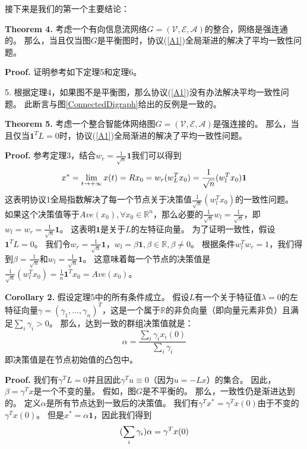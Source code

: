 \documentclass{article}
\begin{document}
接下来是我们的第一个主要结论：

\noindent \textbf{Theorem 4.} 考虑一个有向信息流网络$G=(\mathcal{V}, \mathcal{E}, \mathcal{A})$的整合，网络是强连通的。
那么，当且仅当图$G$是平衡图时，协议(\ref{A1})全局渐进的解决了平均一致性问题。

\noindent \textbf{Proof.} 证明参考如下定理5和定理6。

 5. 根据定理4，如果图不是平衡图，那么协议(\ref{A1})没有办法解决平均一致性问题。
此断言与图\ref{ConnectedDigraph}给出的反例是一致的。

\noindent \textbf{Theorem 5.} 考虑一个整合智能体网络图$G=(\mathcal{V}, \mathcal{E}, \mathcal{A})$是强连接的。
那么，当且仅当$\mathbf{1}^TL=0$时，协议(\ref{A1})全局渐进的解决了平均一致性问题。

\noindent \textbf{Proof.} 参考定理3，结合$w_r = \frac{1}{\sqrt{n}}\mathbf{1}$我们可以得到
\begin{equation}
    x^* = \lim_{t\rightarrow +\infty}x(t) = Rx_0 = w_r(w_L^T x_0) = \frac{1}{\sqrt{n}}(w_l^Tx_0)\mathbf{1}
    \notag
\end{equation}
这表明协议1全局指数解决了每一个节点关于决策值$\frac{1}{\sqrt{n}}(w_l^Tx_0)$的一致性问题。
如果这个决策值等于$Ave(x_0), \forall x_0 \in \mathbb{R}^n$，那么必要的$\frac{1}{\sqrt{n}}w_l = \frac{1}{\sqrt{n}}$，即$w_l= w_r=\frac{1}{\sqrt{n}}\mathbf{1}$。
这表明$\mathbf{1}$是关于$L$的左特征向量。
为了证明一致性，假设$\mathbf{1}^TL=0$。
我们令$w_r=\frac{1}{\sqrt{n}}\mathbf{1}$，$w_l=\beta\mathbf{1},\beta\in\mathbb{R},\beta\ne0$。
根据条件$w_l^Tw_r=1$，我们得到$\beta=\frac{1}{\sqrt{n}}$和$w_l=\frac{1}{\sqrt{n}}\mathbf{1}$。
这意味着每一个节点的决策值是$\frac{1}{\sqrt{n}}(w_l^Tx_0)=\frac{1}{n}\mathbf{1}^Tx_0=Ave(x_0)$。

\noindent \textbf{Corollary 2.} 假设定理5中的所有条件成立。
假设$L$有一个关于特征值$\lambda=0$的左特征向量$\gamma = (\gamma_1, \dots, \gamma_n)^T$，这是一个属于$\mathbb{R}$的非负向量（即向量元素非负）且满足$\sum_i\gamma_i>0$。
那么，达到一致的群组决策值就是：
\begin{equation}
    \alpha = \frac{\sum_i \gamma_ix_i(0)}{\sum_i\gamma_i}
    \tag{19}
    \label{19}
\end{equation}
即决策值是在节点初始值的凸包中。

\noindent \textbf{Proof.} 
我们有$\gamma^TL=0$并且因此$\gamma^Tu\equiv0$（因为$u=-Lx$）的集合。
因此，$\beta=\gamma^Tx$是一个不变的量。
假如，图$G$是不平衡的。
那么，一致性仍是渐进达到的。
定义$\alpha$是所有节点达到一致后的决策值。
我们有$\gamma^Tx^*=\gamma^Tx(0)$由于不变的$\gamma^Tx(0)$。
但是$x^*=\alpha\mathbf{1}$，因此我们得到
\begin{equation}
    (\sum_i\gamma_i)\alpha = \gamma^Tx(0)
    \notag
\end{equation}
\end{document}
